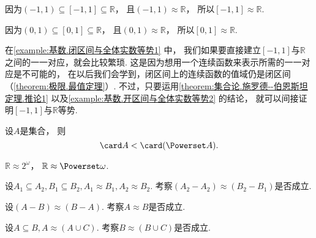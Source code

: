 \begin{example}\label{example:基数.闭区间与全体实数等势1}
因为\((-1,1)\subseteq[-1,1]\subseteq\mathbb{R}\)，
且\((-1,1)\approx\mathbb{R}\)，
所以\([-1,1]\approx\mathbb{R}\).

因为\((0,1)\subseteq[0,1]\subseteq\mathbb{R}\)，
且\((0,1)\approx\mathbb{R}\)，
所以\([0,1]\approx\mathbb{R}\).
\end{example}
在\cref{example:基数.闭区间与全体实数等势1} 中，
我们如果要直接建立\([-1,1]\)与\(\mathbb{R}\)之间的一一对应，就会比较繁琐.
这是因为想用一个连续函数来表示所需的一一对应是不可能的，
在以后我们会学到，闭区间上的连续函数的值域仍是闭区间（\cref{theorem:极限.最值定理}）.
不过，只要运用\cref{theorem:集合论.施罗德--伯恩斯坦定理.推论1}
以及\cref{example:基数.开区间与全体实数等势2} 的结论，
就可以间接证明\([-1,1]\)与\(\mathbb{R}\)等势.

\begin{proposition}
设\(A\)是集合，
则\begin{equation*}
	\card A < \card(\Powerset A).
\end{equation*}
\end{proposition}

\begin{example}
\(\mathbb{R}\approx2^\omega\)，
\(\mathbb{R}\approx\Powerset\omega\).
\end{example}

\begin{example}
设\(A_1 \subseteq A_2,
B_1 \subseteq B_2,
A_1 \approx B_1,
A_2 \approx B_2\).
考察\((A_2 - A_2) \approx (B_2 - B_1)\)是否成立.
\end{example}
\begin{example}
设\((A - B) \approx (B - A)\).
考察\(A \approx B\)是否成立.
\end{example}
\begin{example}
设\(A \subseteq B,
A \approx (A \cup C)\).
考察\(B \approx (B \cup C)\)是否成立.
\end{example}

